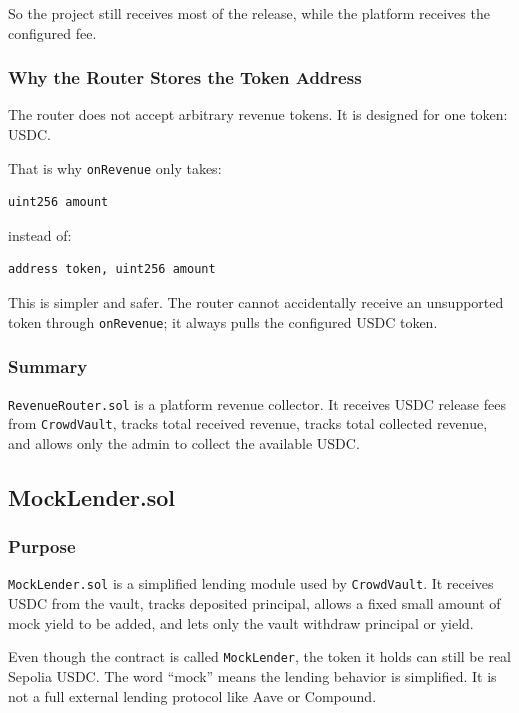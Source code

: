 \documentclass[11pt,a4paper]{article}
\begin{document}
So the project still receives most of the release, while the platform receives the configured fee.

\subsubsection{Why the Router Stores the Token Address}

The router does not accept arbitrary revenue tokens. It is designed for one token: USDC.

That is why \texttt{onRevenue} only takes:

\begin{lstlisting}
uint256 amount
\end{lstlisting}

instead of:

\begin{lstlisting}
address token, uint256 amount
\end{lstlisting}

This is simpler and safer. The router cannot accidentally receive an unsupported token through \texttt{onRevenue}; it always pulls the configured USDC token.

\subsubsection{Summary}

\texttt{RevenueRouter.sol} is a platform revenue collector. It receives USDC release fees from \texttt{CrowdVault}, tracks total received revenue, tracks total collected revenue, and allows only the admin to collect the available USDC.

\subsection{MockLender.sol}

\subsubsection{Purpose}

\texttt{MockLender.sol} is a simplified lending module used by \texttt{CrowdVault}. It receives USDC from the vault, tracks deposited principal, allows a fixed small amount of mock yield to be added, and lets only the vault withdraw principal or yield.

Even though the contract is called \texttt{MockLender}, the token it holds can still be real Sepolia USDC. The word ``mock'' means the lending behavior is simplified. It is not a full external lending protocol like Aave or Compound.
\end{document}

